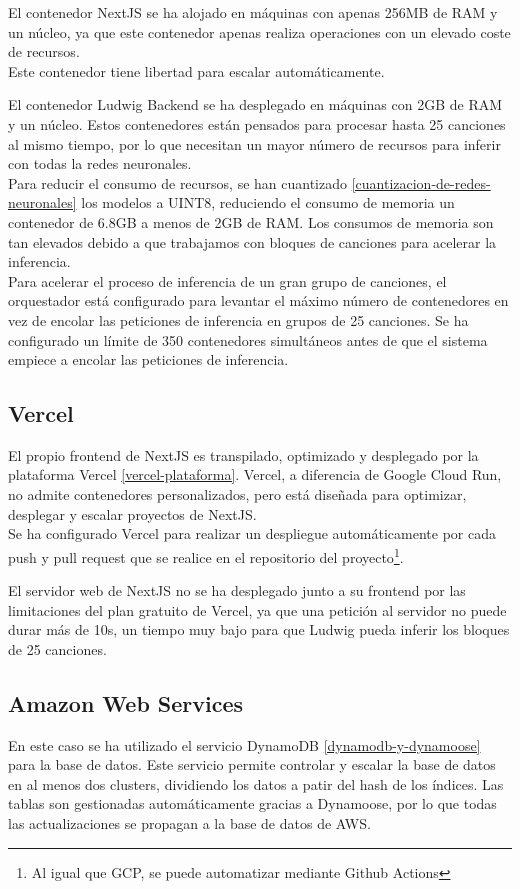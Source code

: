El contenedor NextJS se ha alojado en máquinas con apenas 256MB de RAM y un núcleo, ya que este contenedor apenas realiza operaciones con un elevado coste de recursos. \\
Este contenedor tiene libertad para escalar automáticamente.

El contenedor Ludwig Backend se ha desplegado en máquinas con 2GB de RAM y un núcleo. Estos contenedores están pensados para procesar hasta 25 canciones al mismo tiempo, por lo que necesitan un mayor número de recursos para inferir con todas la redes neuronales.\\
Para reducir el consumo de recursos, se han cuantizado \ref{cuantizacion-de-redes-neuronales} los modelos a UINT8, reduciendo el consumo de memoria un contenedor de 6.8GB a menos de 2GB de RAM.
Los consumos de memoria son tan elevados debido a que trabajamos con bloques de canciones para acelerar la inferencia.\\ 

Para acelerar el proceso de inferencia de un gran grupo de canciones, el orquestador está configurado para levantar el máximo número de contenedores en vez de encolar las peticiones de inferencia en grupos de 25 canciones. Se ha configurado un límite de 350 contenedores simultáneos antes de que el sistema empiece a encolar las peticiones de inferencia.

\subsection{Vercel}\label{vercel_deployment}
El propio frontend de NextJS es transpilado, optimizado y desplegado por la plataforma Vercel \ref{vercel-plataforma}.
Vercel, a diferencia de Google Cloud Run, no admite contenedores personalizados, pero está diseñada para optimizar, desplegar y escalar proyectos de NextJS.\\
Se ha configurado Vercel para realizar un despliegue automáticamente por cada push y pull request que se realice en el repositorio del proyecto\footnote{Al igual que GCP, se puede automatizar mediante Github Actions}. 

El servidor web de NextJS no se ha desplegado junto a su frontend por las limitaciones del plan gratuito de Vercel, ya que una petición al servidor no puede durar más de 10s, un tiempo muy bajo para que Ludwig pueda inferir los bloques de 25 canciones. 

\subsection{Amazon Web Services}
En este caso se ha utilizado el servicio DynamoDB \ref{dynamodb-y-dynamoose} para la base de datos. Este servicio permite controlar y escalar la base de datos en al menos dos clusters, dividiendo los datos a patir del hash de los índices. 
Las tablas son gestionadas automáticamente gracias a Dynamoose, por lo que todas las actualizaciones se propagan a la base de datos de AWS. 


